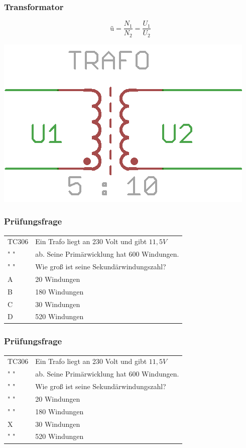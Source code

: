 \begin{frame}
    \frametitle{Transformator}
    $$\text{\"u} = \frac{N_1}{N_2} = \frac{U_1}{U_2}$$
    \begin{center}
        \includegraphics[width=.7\textwidth]{e06/Trafo.png}
    \end{center}
\end{frame}

\begin{frame}
    \frametitle{Prüfungsfrage}
    
    \begin{center}
    \begin{tabular}{l||l}\hline
        TC306 & Ein Trafo liegt an 230 Volt und gibt $11,5V$\\
        " "  & ab. Seine Primärwicklung hat 600 Windungen. \\ 
         " "  & Wie groß ist seine Sekundärwindungszahl?\\\hline\hline
        A & 20 Windungen\\ \hline
    	B & 180 Windungen \\ \hline
        C &  30 Windungen \\ \hline
        D & 520 Windungen \\ \hline
    \end{tabular}
 	    \end{center}
\end{frame}

\begin{frame}
    \frametitle{Prüfungsfrage}
    
    \begin{center}
    \begin{tabular}{l||l}\hline
        TC306 & Ein Trafo liegt an 230 Volt und gibt $11,5V$\\
        " "  & ab. Seine Primärwicklung hat 600 Windungen. \\ 
         " "  & Wie groß ist seine Sekundärwindungszahl?\\\hline\hline
        " " & 20 Windungen\\ \hline
    	" " & 180 Windungen \\ \hline
        X &  30 Windungen \\ \hline
        " " & 520 Windungen \\ \hline
    \end{tabular}
 	    \end{center}
\end{frame}

